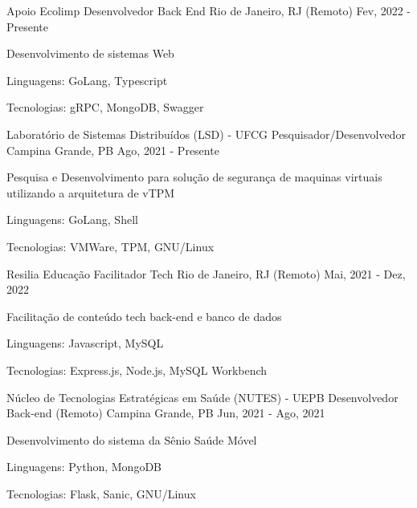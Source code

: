 
\begin{cventries}
  \cventry
  {Apoio Ecolimp} %
  {Desenvolvedor Back End} %
  {Rio de Janeiro, RJ (Remoto)} %
  {Fev, 2022 - Presente} %
  {
    \begin{cvitems} %
      \item {Desenvolvimento de sistemas Web}
      \item {Linguagens: GoLang, Typescript}
      \item {Tecnologias: gRPC, MongoDB, Swagger}
    \end{cvitems}
  }

  \cventry
  {Laboratório de Sistemas Distribuídos (LSD) - UFCG} %
  {Pesquisador/Desenvolvedor} %
  {Campina Grande, PB} %
  {Ago, 2021 - Presente} %
  {
    \begin{cvitems} %
      \item {Pesquisa e Desenvolvimento para solução de segurança de maquinas virtuais utilizando a arquitetura de vTPM}
      \item {Linguagens: GoLang, Shell }
      \item {Tecnologias: VMWare, TPM, GNU/Linux}
    \end{cvitems}
  }

  \cventry
  {Resilia Educação} %
  {Facilitador Tech} %
  {Rio de Janeiro, RJ (Remoto)} %
  {Mai, 2021 - Dez, 2022} %
  {
    \begin{cvitems} %
      \item {Facilitação de conteúdo tech back-end e banco de dados}
      \item {Linguagens: Javascript, MySQL}
      \item {Tecnologias: Express.js, Node.js, MySQL Workbench}
    \end{cvitems}
  }

  \cventry
  {Núcleo de Tecnologias Estratégicas em Saúde (NUTES) - UEPB} %
  {Desenvolvedor Back-end (Remoto)} %
  {Campina Grande, PB} %
  {Jun, 2021 - Ago, 2021} %
  {
    \begin{cvitems} %
      \item {Desenvolvimento do sistema da Sênio Saúde Móvel}
      \item {Linguagens: Python, MongoDB}
      \item {Tecnologias: Flask, Sanic, GNU/Linux}
    \end{cvitems}
  }


\end{cventries}
